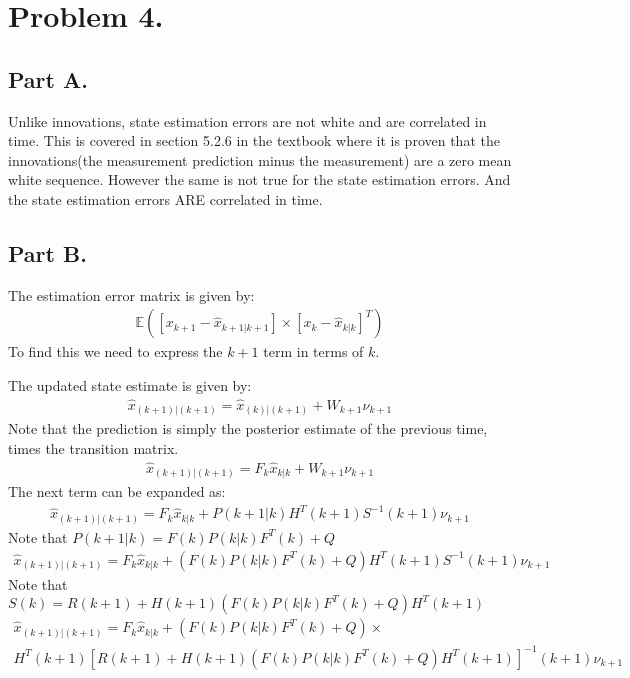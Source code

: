 \documentclass{article}
\begin{document}
\clearpage
\section*{Problem 4.}
\subsection*{Part A.}

Unlike innovations, state estimation errors are not white and are correlated in time. This is covered in section 5.2.6 in the textbook where it is proven that the innovations(the measurement prediction minus the measurement) are a zero mean white sequence. However the same is not true for the state estimation errors. And the state estimation errors ARE correlated in time.

\subsection*{Part B.}
The estimation error matrix is given by:
\begin{align*}
\mathbb{E}([x_{k+1}-\hat{x}_{k+1|k+1}] \times [x_k-\hat{x}_{k|k}]^T)
\end{align*}
To find this we need to express the $k+1$ term in terms of $k$.

The updated state estimate is given by:
\begin{align*}
\hat{x}_{(k+1)|(k+1)} = \hat{x}_{(k)|(k+1)} + W_{k+1} \nu_{k+1}
\end{align*}
Note that the prediction is simply the posterior estimate of the previous time, times the transition matrix.
\begin{align*}
\hat{x}_{(k+1)|(k+1)} = F_k \hat{x}_{k|k} + W_{k+1} \nu_{k+1}
\end{align*}
The next term can be expanded as:
\begin{align*}
\hat{x}_{(k+1)|(k+1)} = F_k \hat{x}_{k|k} + P(k+1|k)H^T(k+1)S^{-1}(k+1) \nu_{k+1}
\end{align*}
Note that $P(k+1|k) = F(k)P(k|k)F^T(k) + Q$
\begin{align*}
\hat{x}_{(k+1)|(k+1)} = F_k \hat{x}_{k|k} + (F(k)P(k|k)F^T(k) + Q)H^T(k+1)S^{-1}(k+1) \nu_{k+1}
\end{align*}
Note that $S(k) = R(k+1)+H(k+1) (F(k)P(k|k)F^T(k) + Q) H^T(k+1)$
\begin{align*}
\hat{x}_{(k+1)|(k+1)} = F_k \hat{x}_{k|k} + (F(k)P(k|k)F^T(k) + Q) \times \\ 
H^T(k+1)[R(k+1)+H(k+1) (F(k)P(k|k)F^T(k) + Q) H^T(k+1)]^{-1}(k+1) \nu_{k+1}
\end{align*}
\end{document}
